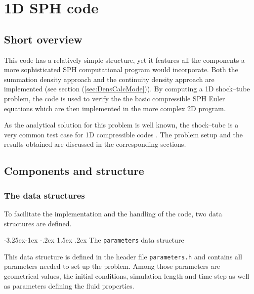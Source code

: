 \documentclass{report}
\makeatletter
\renewcommand\paragraph{\@startsection{paragraph}{4}{\z@}%
  {-3.25ex\@plus -1ex \@minus -.2ex}%
  {1.5ex \@plus .2ex}%
  {\normalfont\normalsize\bfseries}}
\makeatother
\begin{document}
\section{1D SPH code}
\label{sec:1DSPHcode}

\subsection{Short overview}

This code has a relatively simple structure, yet it features all the components
a more sophisticated SPH computational program would incorporate. Both the summation 
density approach and the continuity density approach are implemented (see section (\ref{sec:DensCalcMode})). By computing a 1D shock--tube problem, the code is used to verify the the basic compressible SPH Euler equations which are then implemented in the more complex 2D program.
 
As the analytical solution for this problem is well known, the shock--tube is a very 
common test case for 1D compressible codes \cite{Sod1978}.
The problem setup and the results obtained are discussed in the corresponding sections.

\subsection{Components and structure}
\label{sec:CompAndStruc1DCode}

\subsubsection{The data structures}

To facilitate the implementation and the handling of the code, two data structures are defined. 

\paragraph{The {\tt parameters} data structure}

This data structure is defined in the header file {\tt parameters.h} and 
contains all parameters needed to set up the problem. Among those parameters are 
geometrical values, the initial conditions, simulation length and time step 
as well as parameters defining the fluid properties.
\end{document}
